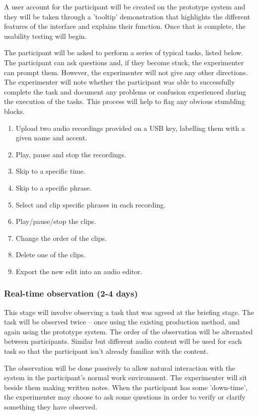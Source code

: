 A user account for the participant will be created on the prototype system and
they will be taken through a 'tooltip' demonstration that highlights the
different features of the interface and explains their function. Once that is
complete, the usability testing will begin.

The participant will be asked to perform a series of typical tasks, listed
below. The participant can ask questions and, if they become stuck, the
experimenter can prompt them. However, the experimenter will not give any other
directions. The experimenter will note whether the participant was able to
successfully complete the task and document any problems or confusion
experienced during the execution of the tasks. This process will help to flag
any obvious stumbling blocks.

\begin{enumerate}
\item Upload two audio recordings provided on a USB key, labelling them with a given name and accent.
\item Play, pause and stop the recordings.
\item Skip to a specific time.
\item Skip to a specific phrase.
\item Select and clip specific phrases in each recording.
\item Play/pause/stop the clips.
\item Change the order of the clips.
\item Delete one of the clips.
\item Export the new edit into an audio editor.
\end{enumerate}

\subsubsection{Real-time observation (2-4 days)}
This stage will involve observing a task that was agreed at the briefing stage.
The task will be observed twice – once using the existing production method,
and again using the prototype system. The order of the observation will be
alternated between participants. Similar but different audio content will be
used for each task so that the participant isn't already familiar with the
content.

The observation will be done passively to allow natural interaction with the
system in the participant's normal work environment. The experimenter will sit
beside them making written notes. When the participant has some 'down-time',
the experimenter may choose to ask some questions in order to verify or clarify
something they have observed.

